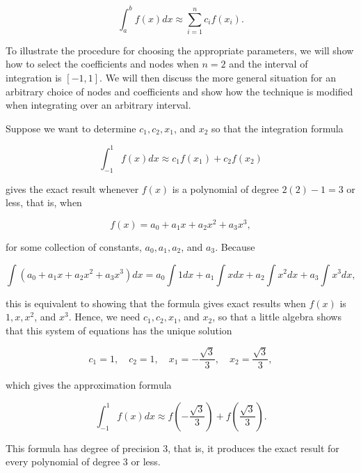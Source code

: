 \documentclass[preprint,12pt]{elsarticle}
\begin{document}
\begin{equation}
    \int_{a}^{b}f(x)dx \approx \sum_{i=1}^{n}c_{i}f(x_i).
\end{equation}

To illustrate the procedure for choosing the appropriate parameters, we will show how to select the coefficients and nodes when $n=2$ and the interval of integration is $[-1,1]$. We will then discuss the more general situation for an arbitrary choice of nodes and coefficients and show how the technique is modified when integrating over an arbitrary interval.

Suppose we want to determine $c_1,c_2,x_1$, and $x_2$ so that the integration formula

\begin{equation}
    \int_{-1}^{1}f(x)dx \approx c_{1}f(x_1)+c_{2}f(x_2)
\end{equation}

gives the exact result whenever $f(x)$ is a polynomial of degree $2(2)-1=3$ or less, that is, when

\begin{equation}
    f(x)=a_{0}+a_{1}x+a_{2}x^{2}+a_{3}x^{3},
\end{equation}

for some collection of constants, $a_0,a_1,a_2$, and $a_3$. Because

\begin{equation}
    \int (a_{0}+a_{1}x+a_{2}x^{2}+a_{3}x^{3})dx = a_{0}\int 1dx + a_{1}\int xdx + a_{2}\int x^{2}dx + a_{3}\int x^{3}dx,
\end{equation}

this is equivalent to showing that the formula gives exact results when $f(x)$ is $1,x,x^{2}$, and $x^{3}$. Hence, we need $c_1,c_2,x_1$, and $x_2$, so that a little algebra shows that this system of equations has the unique solution

\begin{equation}
    c_{1}=1,\quad c_{2}=1,\quad x_{1}=-\frac{\sqrt{3}}{3},\quad x_{2}=\frac{\sqrt{3}}{3},
\end{equation}

which gives the approximation formula

\begin{equation}
    \int_{-1}^{1} f(x)dx \approx f(-\frac{\sqrt{3}}{3})+f(\frac{\sqrt{3}}{3}).
\end{equation}

This formula has degree of precision 3, that is, it produces the exact result for every polynomial of degree 3 or less.
\end{document}
